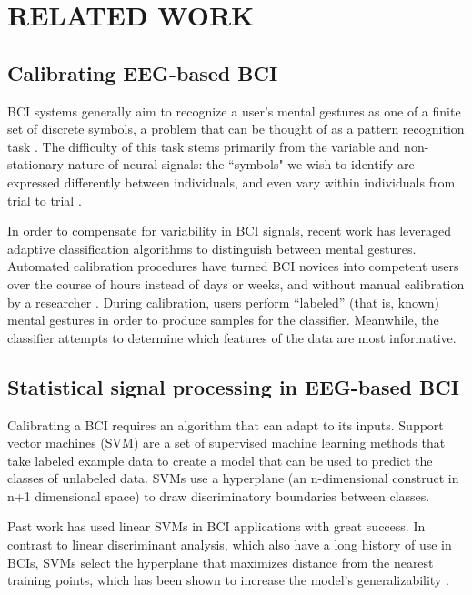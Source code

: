 \section{\uppercase{Related Work}}

\subsection{Calibrating EEG-based BCI}

\noindent BCI systems generally aim to recognize a user's mental gestures as one of a finite set of discrete symbols, a problem that can be thought of as a pattern recognition task \cite{lotte_review_2007}. The difficulty of this task stems primarily from the variable and non-stationary nature of neural signals: the ``symbols" we wish to identify are expressed differently between individuals, and even vary within individuals from trial to trial \cite{vidaurre_fully_2006,vidaurre_machine-learning-based_2011}. 

In order to compensate for variability in BCI signals, recent work has leveraged adaptive classification algorithms to distinguish between mental gestures. \cite{lotte_review_2007,vidaurre_machine-learning-based_2011} Automated calibration procedures have turned BCI novices into competent users over the course of hours instead of days or weeks, and without manual calibration by a researcher \cite{vidaurre_fully_2006,vidaurre_co-adaptive_2011,vidaurre_machine-learning-based_2011}. During calibration, users perform ``labeled'' (that is, known) mental gestures in order to produce samples for the classifier. Meanwhile, the classifier attempts to determine which features of the data are most informative. 

\subsection{Statistical signal processing in EEG-based BCI}

Calibrating a BCI requires an algorithm that can adapt to its inputs. Support vector machines (SVM) are a set of supervised machine learning methods that take labeled example data to create a model that can be used to predict the classes of unlabeled data. SVMs use a hyperplane (an n-dimensional construct in n+1 dimensional space) to draw discriminatory boundaries between classes. 

Past work has used linear SVMs in BCI applications with great success. \cite{garrett_comparison_2003,grierson_better_2011} In contrast to linear discriminant analysis, which also have a long history of use in BCIs, SVMs select the hyperplane that maximizes distance from the nearest training points, which has been shown to increase the model's generalizability \cite{burges_tutorial_1998}. 

